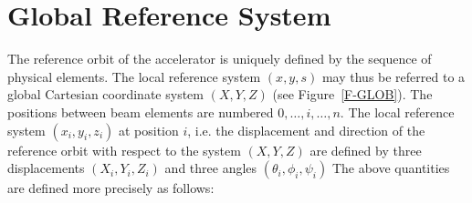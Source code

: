 \section{Global Reference System}
\label{S-LAYOUT}
The reference orbit of the accelerator is uniquely defined by the
sequence of physical elements.
The local reference system \((x, y, s)\) may thus be referred
to a global Cartesian coordinate system \((X, Y, Z)\)
(see Figure~\ref{F-GLOB}).
The positions between beam elements are numbered \(0,\ldots,i,\ldots,n\).
The local reference system \((x_{i}, y_{i}, z_{i})\)
at position \(i\),
i.e. the displacement and direction of the reference orbit
with respect to the system \((X, Y, Z)\) are defined by
three displacements \((X_{i}, Y_{i}, Z_{i})\)
and three angles \((\theta_{i}, \phi_{i}, \psi_{i})\)
The above quantities are defined more precisely as follows:
 
